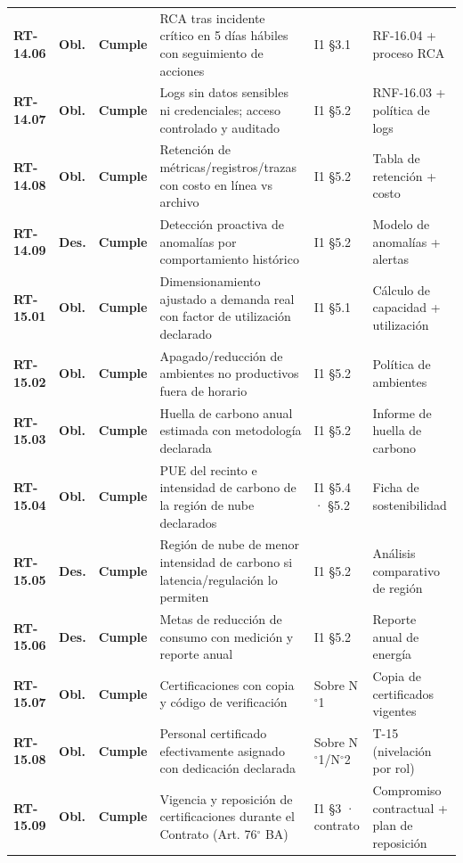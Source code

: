 \begin{small}
\begin{longtable}{@{}p{1.35cm} p{1.15cm} p{1.15cm} p{4.6cm} p{2.35cm} p{3.8cm}@{}}
\textbf{RT-14.06} & \textbf{Obl.} & \textbf{Cumple} & RCA tras incidente cr\'itico en 5 d\'ias h\'abiles con seguimiento de acciones & I1 §3.1 & RF-16.04 + proceso RCA \\
\textbf{RT-14.07} & \textbf{Obl.} & \textbf{Cumple} & Logs sin datos sensibles ni credenciales; acceso controlado y auditado & I1 §5.2 & RNF-16.03 + pol\'itica de logs \\
\textbf{RT-14.08} & \textbf{Obl.} & \textbf{Cumple} & Retenci\'on de m\'etricas/registros/trazas con costo en l\'inea vs archivo & I1 §5.2 & Tabla de retenci\'on + costo \\
\textbf{RT-14.09} & \textbf{Des.} & \textbf{Cumple} & Detecci\'on proactiva de anomal\'ias por comportamiento hist\'orico & I1 §5.2 & Modelo de anomal\'ias + alertas \\
\textbf{RT-15.01} & \textbf{Obl.} & \textbf{Cumple} & Dimensionamiento ajustado a demanda real con factor de utilizaci\'on declarado & I1 §5.1 & C\'alculo de capacidad + utilizaci\'on \\
\textbf{RT-15.02} & \textbf{Obl.} & \textbf{Cumple} & Apagado/reducci\'on de ambientes no productivos fuera de horario & I1 §5.2 & Pol\'itica de ambientes \\
\textbf{RT-15.03} & \textbf{Obl.} & \textbf{Cumple} & Huella de carbono anual estimada con metodolog\'ia declarada & I1 §5.2 & Informe de huella de carbono \\
\textbf{RT-15.04} & \textbf{Obl.} & \textbf{Cumple} & PUE del recinto e intensidad de carbono de la regi\'on de nube declarados & I1 §5.4 · §5.2 & Ficha de sostenibilidad \\
\textbf{RT-15.05} & \textbf{Des.} & \textbf{Cumple} & Regi\'on de nube de menor intensidad de carbono si latencia/regulaci\'on lo permiten & I1 §5.2 & An\'alisis comparativo de regi\'on \\
\textbf{RT-15.06} & \textbf{Des.} & \textbf{Cumple} & Metas de reducci\'on de consumo con medici\'on y reporte anual & I1 §5.2 & Reporte anual de energ\'ia \\
\textbf{RT-15.07} & \textbf{Obl.} & \textbf{Cumple} & Certificaciones con copia y c\'odigo de verificaci\'on & Sobre N$^{\circ}$1 & Copia de certificados vigentes \\
\textbf{RT-15.08} & \textbf{Obl.} & \textbf{Cumple} & Personal certificado efectivamente asignado con dedicaci\'on declarada & Sobre N$^{\circ}$1/N$^{\circ}$2 & T-15 (nivelaci\'on por rol) \\
\textbf{RT-15.09} & \textbf{Obl.} & \textbf{Cumple} & Vigencia y reposici\'on de certificaciones durante el Contrato (Art. 76$^{\circ}$ BA) & I1 §3 · contrato & Compromiso contractual + plan de reposici\'on \\

\end{longtable}
\end{small}
